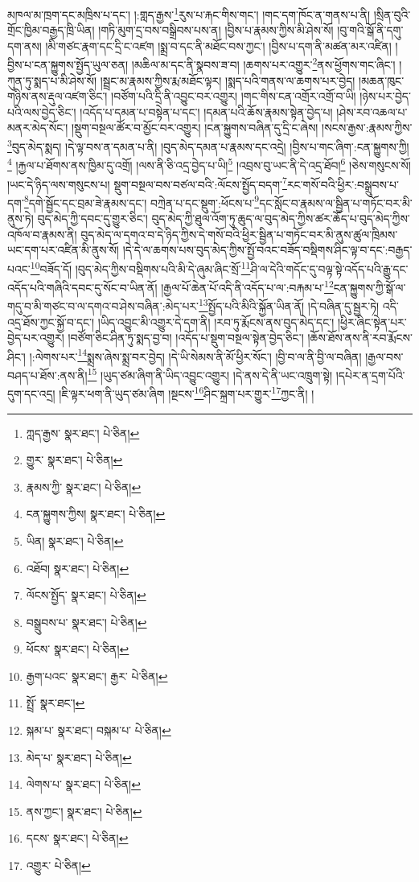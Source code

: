 མཁལ་མ་ཁྲག་དང་མཁྲིས་པ་དང་། །:གླད་རྒྱས་\footnote{ཀླད་རྒྱས་  སྣར་ཐང་།  པེ་ཅིན། }རུས་པ་རྐང་གིས་གང་། །གང་དག་ཁོང་ན་གནས་པ་ནི། །སྲིན་བུའི་གྲོང་ཁྱིམ་བརྒྱད་ཁྲི་ཡིན། །གཏི་མུག་དྲ་བས་བསྒྲིབས་པས་ན། །བྱིས་པ་རྣམས་ཀྱིས་མི་ཤེས་སོ། །བུ་གའི་སྒོ་ནི་དགུ་དག་ནས། །མི་གཙང་རྣག་དང་དྲི་ང་འཛག །སྨྲ་བ་དང་ནི་མཐོང་བས་ཀྱང་། །བྱིས་པ་དག་ནི་མཚན་མར་འཛིན། །བྱིས་པ་ངན་སྐྱུགས་སྤྱོད་ཡུལ་ཅན། །མཆིལ་མ་དང་ནི་སྣབས་ཟ་བ། །ཆགས་པར་འགྱུར་\footnote{གྱུར་  སྣར་ཐང་།  པེ་ཅིན། }ནས་ཕྱོགས་གང་ཞིང་། །ཀུན་ཏུ་སྨད་པ་མི་ཤེས་སོ། །སྦྲང་མ་རྣམས་ཀྱིས་རྨ་མཐོང་ལྟར། །སྨད་པའི་གནས་ལ་ཆགས་པར་བྱེད། །མཆན་ཁུང་གཉིས་ནས་རྡུལ་འཛག་ཅིང་། །བཙོག་པའི་དྲི་ནི་འབྱུང་བར་འགྱུར། །གང་གིས་ངན་འགྲོར་འགྲོ་བ་ཡི། །ཉེས་པར་བྱེད་པའི་ལས་བྱེད་ཅིང་། །འདོད་པ་དམན་པ་བསྟེན་པ་དང་། །དམན་པའི་ཆོས་རྣམས་སྟེན་བྱེད་པ། །ཤེས་རབ་འཆལ་པ་མནར་མེད་སོང་། །སྡུག་བསྔལ་ཚོར་བ་མྱོང་བར་འགྱུར། །ངན་སྐྱུགས་བཞིན་དུ་དྲི་ང་ཞེས། །སངས་རྒྱས་:རྣམས་ཀྱིས་\footnote{རྣམས་ཀྱི་  སྣར་ཐང་།  པེ་ཅིན། }བུད་མེད་སྨད། །དེ་ལྟ་བས་ན་དམན་པ་ནི། །བུད་མེད་དམན་པ་རྣམས་དང་འདྲེ། །བྱིས་པ་གང་ཞིག་:ངན་སྐྱུགས་ཀྱི།\footnote{ངན་སྐྱུགས་ཀྱིས།  སྣར་ཐང་།  པེ་ཅིན། } །རྐྱལ་པ་ཐོགས་ནས་ཁྱིམ་དུ་འགྲོ། །ལས་ནི་ཅི་འདྲ་བྱེད་པ་ཡི།\footnote{ཡིན།  སྣར་ཐང་།  པེ་ཅིན། } །འབྲས་བུ་ཡང་ནི་དེ་འདྲ་ཐོབ།\footnote{འཐོབ།  སྣར་ཐང་།  པེ་ཅིན། } །ཅེས་གསུངས་སོ། །ཡང་དེ་ཉིད་ལས་གསུངས་པ། སྡུག་བསྔལ་བས་བཙལ་བའི་:ལོངས་སྤྱོད་བདག་\footnote{ལོངས་སྤྱོད་  སྣར་ཐང་།  པེ་ཅིན། }རང་གསོ་བའི་ཕྱིར་:བསྒྲུབས་པ་དག་\footnote{བསྒྲུབས་པ་  སྣར་ཐང་།  པེ་ཅིན། }དགེ་སྦྱོང་དང་བྲམ་ཟེ་རྣམས་དང་། བཀྲེན་པ་དང་སྡུག་:ཕོངས་པ་\footnote{ཕོངས་  སྣར་ཐང་།  པེ་ཅིན། }དང་སློང་བ་རྣམས་ལ་སྦྱིན་པ་གཏོང་བར་མི་ནུས་ཏེ། བུད་མེད་ཀྱི་དབང་དུ་གྱུར་ཅིང་། བུད་མེད་ཀྱི་ཐུལ་འོག་ཏུ་ཆུད་ལ་བུད་མེད་ཀྱིས་ཚར་ཆོད་པ་བུད་མེད་ཀྱིས་འཁོལ་བ་རྣམས་ནི། བུད་མེད་ལ་དགའ་བ་དེ་ཉིད་ཀྱིས་དེ་གསོ་བའི་ཕྱིར་སྦྱིན་པ་གཏོང་བར་མི་ནུས་ཚུལ་ཁྲིམས་ཡང་དག་པར་འཛིན་མི་ནུས་སོ། །དེ་དེ་ལ་ཆགས་པས་བུད་མེད་ཀྱིས་སྤྱོ་བའང་བཟོད་བསྡིགས་ཤིང་ལྟ་བ་དང་:བརྒྱད་པའང་\footnote{རྒྱག་པའང་  སྣར་ཐང་། རྒྱར་  པེ་ཅིན། }བཟོད་དོ། །བུད་མེད་ཀྱིས་བསྡིགས་པའི་མི་དེ་ཞུམ་ཞིང་སྲོ་\footnote{སྤྲོ་  སྣར་ཐང་། }ཤི་ལ་དེའི་གདོང་དུ་བལྟ་སྟེ་འདོད་པའི་རྒྱུ་དང་འདོད་པའི་གཞིའི་དབང་དུ་སོང་བ་ཡིན་ནོ། །རྒྱལ་པོ་ཆེན་པོ་འདི་ནི་འདོད་པ་ལ་:བརྐམ་པ་\footnote{སྐམ་པ་  སྣར་ཐང་། བསྐམ་པ་  པེ་ཅིན། }ངན་སྐྱུགས་ཀྱི་སྒོ་ལ་གདུ་བ་མི་གཙང་བ་ལ་དགའ་བ་ཤེས་བཞིན་:མེད་པར་\footnote{མེད་པ་  སྣར་ཐང་།  པེ་ཅིན། }སྤྱོད་པའི་མིའི་སྐྱོན་ཡིན་ནོ། །དེ་བཞིན་དུ་སྦྱར་ཏེ། འདི་འདྲ་ཐོས་ཀྱང་སྐྱོ་བ་དང་། །ཡིད་འབྱུང་མི་འགྱུར་དེ་དག་ནི། །རབ་ཏུ་རྨོངས་ནས་བུད་མེད་དང་། །ཕྱིར་ཞིང་སྟེན་པར་བྱེད་པར་འགྱུར། །བཙོག་ཅིང་ཤིན་ཏུ་སྨད་བྱ་བ། །འདོད་པ་སྡུག་བསྔལ་སྟེན་བྱེད་ཅིང་། །ཆོས་ཐོས་ནས་ནི་རབ་རྨོངས་ཤིང་། །:ལེགས་པར་\footnote{ལེགས་པ་  སྣར་ཐང་།  པེ་ཅིན། }སྨྲས་ཞེས་སྨྲ་བར་བྱེད། །དེ་ཡི་སེམས་ནི་མོ་ཕྱིར་སོང་། །བྱི་བ་ལ་ནི་བྱི་ལ་བཞིན། །རྒྱལ་བས་བཤད་པ་ཐོས་:ནས་ནི།\footnote{ནས་ཀྱང་།  སྣར་ཐང་།  པེ་ཅིན། } །ཡུད་ཙམ་ཞིག་ནི་ཡིད་འབྱུང་འགྱུར། །དེ་ནས་དེ་ནི་ཡང་འཁྲུག་སྟེ། །དཔེར་ན་དྲག་པོའི་དུག་དང་འདྲ། །ཇི་ལྟར་ཕག་ནི་ཡུད་ཙམ་ཞིག །སྔངས་\footnote{དངས་  སྣར་ཐང་།  པེ་ཅིན། }ཤིང་སྐྲག་པར་གྱུར་\footnote{འགྱུར་  པེ་ཅིན། }ཀྱང་ནི། །
